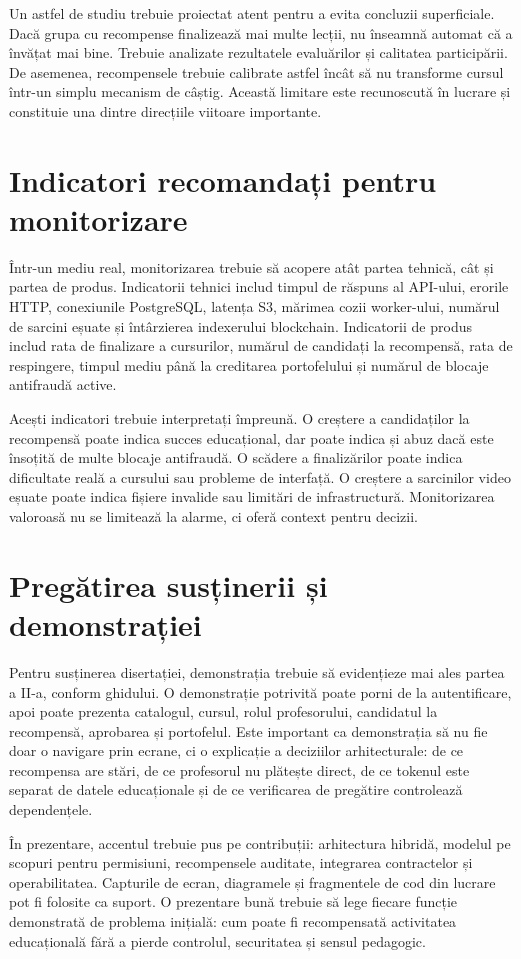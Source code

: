 Un astfel de studiu trebuie proiectat atent pentru a evita concluzii superficiale. Dacă grupa cu recompense finalizează mai multe lecții, nu înseamnă automat că a învățat mai bine. Trebuie analizate rezultatele evaluărilor și calitatea participării. De asemenea, recompensele trebuie calibrate astfel încât să nu transforme cursul într-un simplu mecanism de câștig. Această limitare este recunoscută în lucrare și constituie una dintre direcțiile viitoare importante.

\section{Indicatori recomandați pentru monitorizare}
Într-un mediu real, monitorizarea trebuie să acopere atât partea tehnică, cât și partea de produs. Indicatorii tehnici includ timpul de răspuns al API-ului, erorile HTTP, conexiunile PostgreSQL, latența S3, mărimea cozii worker-ului, numărul de sarcini eșuate și întârzierea indexerului blockchain. Indicatorii de produs includ rata de finalizare a cursurilor, numărul de candidați la recompensă, rata de respingere, timpul mediu până la creditarea portofelului și numărul de blocaje antifraudă active.

Acești indicatori trebuie interpretați împreună. O creștere a candidaților la recompensă poate indica succes educațional, dar poate indica și abuz dacă este însoțită de multe blocaje antifraudă. O scădere a finalizărilor poate indica dificultate reală a cursului sau probleme de interfață. O creștere a sarcinilor video eșuate poate indica fișiere invalide sau limitări de infrastructură. Monitorizarea valoroasă nu se limitează la alarme, ci oferă context pentru decizii.

\section{Pregătirea susținerii și demonstrației}
Pentru susținerea disertației, demonstrația trebuie să evidențieze mai ales partea a II-a, conform ghidului. O demonstrație potrivită poate porni de la autentificare, apoi poate prezenta catalogul, cursul, rolul profesorului, candidatul la recompensă, aprobarea și portofelul. Este important ca demonstrația să nu fie doar o navigare prin ecrane, ci o explicație a deciziilor arhitecturale: de ce recompensa are stări, de ce profesorul nu plătește direct, de ce tokenul este separat de datele educaționale și de ce verificarea de pregătire controlează dependențele.

În prezentare, accentul trebuie pus pe contribuții: arhitectura hibridă, modelul pe scopuri pentru permisiuni, recompensele auditate, integrarea contractelor și operabilitatea. Capturile de ecran, diagramele și fragmentele de cod din lucrare pot fi folosite ca suport. O prezentare bună trebuie să lege fiecare funcție demonstrată de problema inițială: cum poate fi recompensată activitatea educațională fără a pierde controlul, securitatea și sensul pedagogic.

